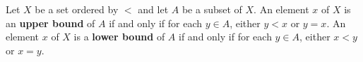 Let $X$ be a set ordered by $<$ and let $A$ be a subset of $X$. An element $x$ of $X$ is an \textbf{upper bound} of $A$ if and only if for each $y \in A$, either $y < x$ or $y = x$. An element $x$ of $X$ is a \textbf{lower bound} of $A$ if and only if for each $y \in A$, either $x < y$ or $x = y$.

